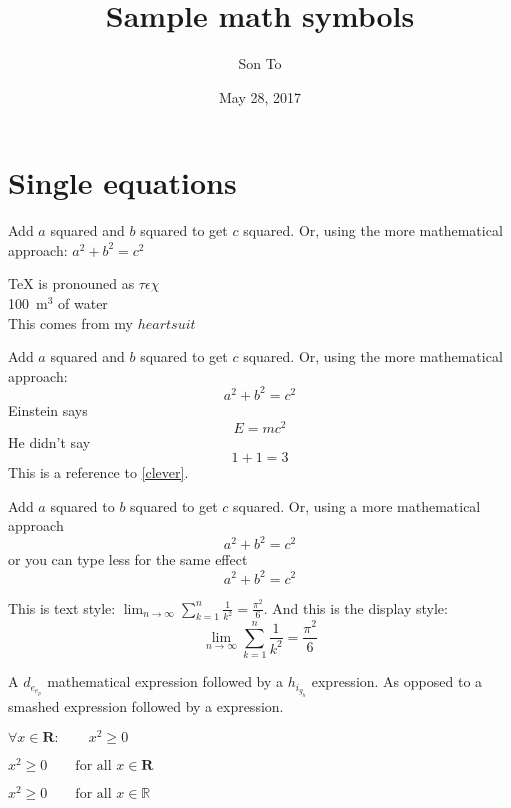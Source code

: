 \documentclass[a4paper,11pt]{report}
\author{Son To}
\title{Sample math symbols}
\date{May 28, 2017}
\theoremstyle{definition} \newtheorem{law}{Law}[chapter]
\theoremstyle{plain} \newtheorem{jury}[law]{Jury}
\theoremstyle{remark} \newtheorem*{marg}{Margaret}
\begin{document}
\maketitle
\tableofcontents
\chapter{Single equations}
Add $a$ squared and $b$ squared to get $c$ squared. Or,
using the more mathematical approach:
$a^2 + b^2 = c^2$ %

\TeX{} is pronouned as $\tau\epsilon\chi$\\[5pt] %
100~m$^3$ of water\\[5pt]
This comes from my $heartsuit$

Add $a$ squared and $b$ squared to get $c$ squared. Or,
using the more mathematical approach:
\begin{equation}
  a^2 + b^2 = c^2 %
\end{equation}
Einstein says
\begin{equation}
  E = mc^2 \label{clever}
\end{equation}
He didn't say
\begin{equation}
  1 + 1 = 3 \tag{bollocks}
\end{equation}
This is a reference to \eqref{clever}.

Add $a$ squared to $b$ squared to get $c$ squared. Or, using
a more mathematical approach
\begin{equation*}
  a^2 + b^2 = c^2
\end{equation*}
or you can type less for the same effect
\[ a^2 + b^2 = c^2 \]

This is text style: $\lim_{n \to \infty}
\sum_{k=1}^n \frac{1}{k^2} = \frac{\pi^2}{6}$.
And this is the display style:
\begin{equation}
  \lim_{n \to \infty} \sum_{k=1}^n \frac{1}{k^2}
  = \frac{\pi^2}{6}
\end{equation}

A $d_{e_{e_p}}$ mathematical expression followed
by a $h_{i_{g_h}}$ expression. As opposed to a smashed
 expression followed by a
 expression.

$\forall x \in \mathbf{R}: \qquad x^2 \geq 0$

$x^{2} \geq 0 \qquad \text{for all } x \in \mathbf{R}$

$x^{2} \geq 0 \qquad \text{for all } x \in \mathbb{R}$
\end{document}
